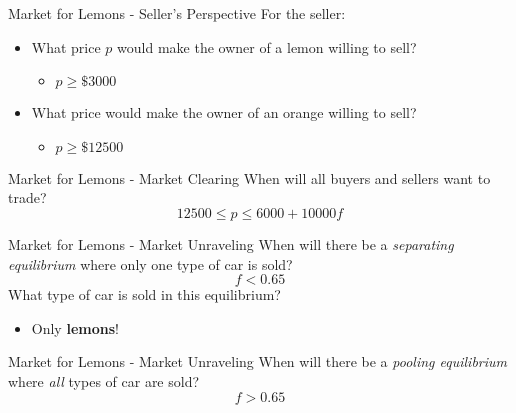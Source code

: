 
\begin{frame}{Market for Lemons - Seller's Perspective}
  For the seller: \\ 
  \begin{itemize}
    \item What price $p$ would make the owner of a lemon willing to sell?
      \pause
      \begin{itemize}
        \item $p \geq \$3000$
      \end{itemize}
    \item What price would make the owner of an orange willing to sell?
      \pause
      \begin{itemize}
        \item $p \geq \$12500$
      \end{itemize}
  \end{itemize}
\end{frame}


\begin{frame}{Market for Lemons - Market Clearing}
  When will all buyers and sellers want to trade?
  \pause
  $$12500 \leq p \leq 6000 + 10000f$$
\end{frame}


\begin{frame}{Market for Lemons - Market Unraveling}
  When will there be a \textit{separating equilibrium}
  where only one type of car is sold?
  \pause
  $$f < 0.65$$
  \pause
  What type of car is sold in this equilibrium?
  \begin{itemize}
    \item Only \textbf{lemons}!
  \end{itemize}
\end{frame}


\begin{frame}{Market for Lemons - Market Unraveling}
  When will there be a \textit{pooling equilibrium}
  where \textit{all} types of car are sold?
  \pause
  $$f > 0.65$$
  \pause
\end{frame}

